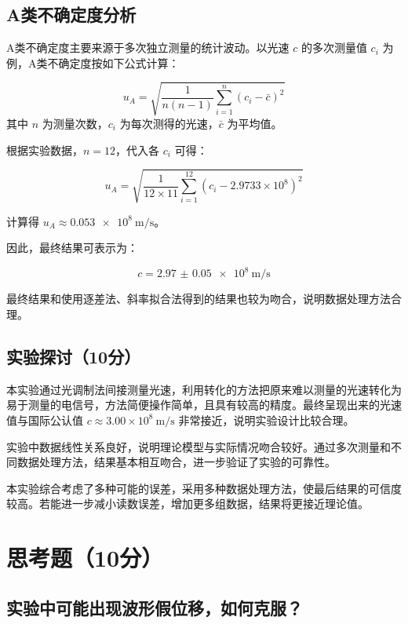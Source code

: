 \documentclass[]{../template/Report}%
\begin{document}
\subsection{A类不确定度分析}

A类不确定度主要来源于多次独立测量的统计波动。以光速 $c$ 的多次测量值 $c_i$ 为例，A类不确定度按如下公式计算：

\begin{equation}
    u_A = \sqrt{\frac{1}{n(n-1)} \sum_{i=1}^n (c_i - \bar{c})^2}
\end{equation}
其中 $n$ 为测量次数，$c_i$ 为每次测得的光速，$\bar{c}$ 为平均值。

根据实验数据，$n=12$，代入各 $c_i$ 可得：

\begin{equation}
    u_A = \sqrt{\frac{1}{12 \times 11} \sum_{i=1}^{12} (c_i - 2.9733 \times 10^8)^2}
\end{equation}

计算得 $ u_A \approx \SI{0.053e8}{\meter\per\second}$。

因此，最终结果可表示为：

\begin{equation}
    c = \SI{2.97(5)e8}{\meter\per\second}
\end{equation}

最终结果和使用逐差法、斜率拟合法得到的结果也较为吻合，说明数据处理方法合理。

\subsection{实验探讨（10分）}
本实验通过光调制法间接测量光速，利用转化的方法把原来难以测量的光速转化为易于测量的电信号，方法简便操作简单，且具有较高的精度。最终呈现出来的光速值与国际公认值 $c \approx 3.00 \times 10^8\ \mathrm{m/s}$ 非常接近，说明实验设计比较合理。

实验中数据线性关系良好，说明理论模型与实际情况吻合较好。通过多次测量和不同数据处理方法，结果基本相互吻合，进一步验证了实验的可靠性。

本实验综合考虑了多种可能的误差，采用多种数据处理方法，使最后结果的可信度较高。若能进一步减小读数误差，增加更多组数据，结果将更接近理论值。


\newpage
\section{思考题（10分）}
\subsection{实验中可能出现波形假位移，如何克服？}
\end{document}
